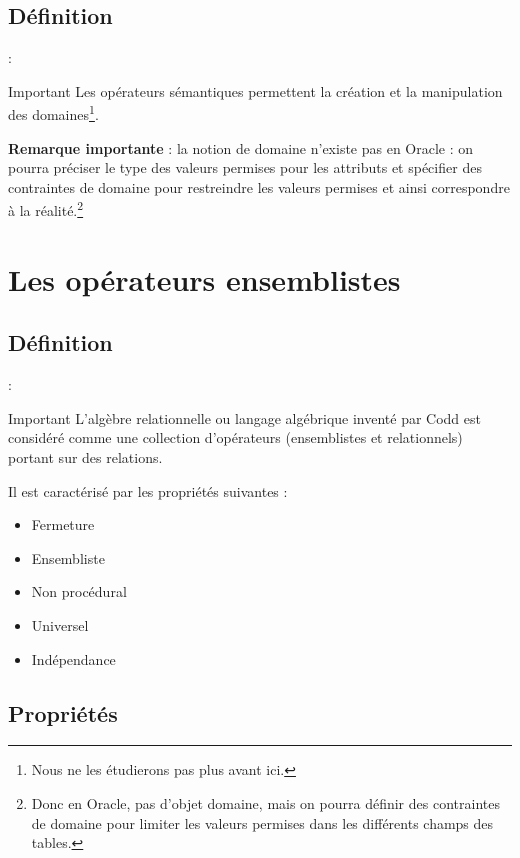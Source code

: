 \documentclass[10pt]{beamer}
\begin{document}
\subsection{Définition}
\begin{frame}{\secname : \subsecname}
    \begin{alertblock}{Important}
        Les opérateurs sémantiques permettent la création et la manipulation des domaines\footnote{Nous ne les étudierons pas plus avant ici.}.
    \end{alertblock}
    \textbf{Remarque importante} : la notion de domaine n’existe pas en Oracle : on pourra préciser le type des valeurs permises pour les attributs et spécifier des contraintes de domaine pour restreindre les valeurs permises et ainsi correspondre à la réalité.\footnote{Donc en Oracle, pas d'objet domaine, mais on pourra définir des contraintes de domaine pour limiter les valeurs permises dans les différents champs des tables.}
\end{frame}

\section{Les opérateurs ensemblistes}
\subsection{Définition}
\begin{frame}{\secname : \subsecname}
    \begin{alertblock}{Important}
        L’algèbre relationnelle ou langage algébrique inventé par Codd est considéré comme une collection d’opérateurs (ensemblistes et relationnels) portant sur des relations.
    \end{alertblock}
    Il est caractérisé par les propriétés suivantes :
    \begin{itemize}
        \item Fermeture
        \item Ensembliste
        \item Non procédural
        \item Universel
        \item Indépendance
    \end{itemize}
\end{frame}

\subsection{Propriétés}
\end{document}
